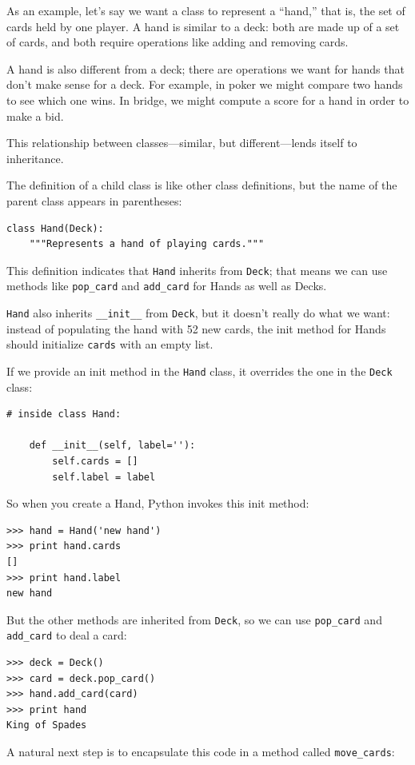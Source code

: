 \documentclass[12pt,a4paper,final,twoside,onecolumn,titlepage]{book}
\begin{document}
As an example, let's say we want a class to represent a ``hand,''
that is, the set of cards held by one player.  A hand is similar to a
deck: both are made up of a set of cards, and both require operations
like adding and removing cards.

A hand is also different from a deck; there are operations we want for
hands that don't make sense for a deck.  For example, in poker we
might compare two hands to see which one wins.  In bridge, we might
compute a score for a hand in order to make a bid.

This relationship between classes---similar, but different---lends
itself to inheritance.  

The definition of a child class is like other class definitions,
but the name of the parent class appears in parentheses:

\begin{verbatim}
class Hand(Deck):
    """Represents a hand of playing cards."""
\end{verbatim}
%
This definition indicates that {\tt Hand} inherits from {\tt Deck};
that means we can use methods like \verb"pop_card" and \verb"add_card"
for Hands as well as Decks.

{\tt Hand} also inherits \verb"__init__" from {\tt Deck}, but
it doesn't really do what we want: instead of populating the hand
with 52 new cards, the init method for Hands should initialize
{\tt cards} with an empty list.

If we provide an init method in the {\tt Hand} class, it overrides the
one in the {\tt Deck} class:

\begin{verbatim}
# inside class Hand:

    def __init__(self, label=''):
        self.cards = []
        self.label = label
\end{verbatim}
%
So when you create a Hand, Python invokes this init method:

\begin{verbatim}
>>> hand = Hand('new hand')
>>> print hand.cards
[]
>>> print hand.label
new hand
\end{verbatim}
%
But the other methods are inherited from {\tt Deck}, so we can use
\verb"pop_card" and \verb"add_card" to deal a card:

\begin{verbatim}
>>> deck = Deck()
>>> card = deck.pop_card()
>>> hand.add_card(card)
>>> print hand
King of Spades
\end{verbatim}
%
A natural next step is to encapsulate this code in a method
called \verb"move_cards":
\end{document}
